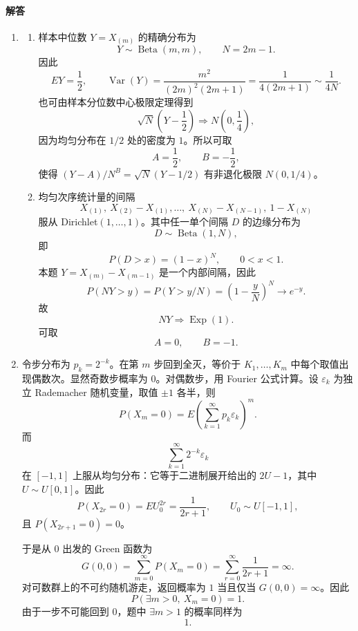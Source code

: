 \documentclass[UTF8,12pt]{ctexart}
\begin{document}
\paragraph{解答}
\begin{enumerate}[label=\textbf{\arabic*.},leftmargin=2.2em]
\item
\begin{enumerate}[label=\textbf{(\alph*)},leftmargin=2.4em]
\item 样本中位数 \(Y=X_{(m)}\) 的精确分布为
\[
Y\sim \operatorname{Beta}(m,m),\qquad N=2m-1.
\]
因此
\[
E Y=\frac12,\qquad
\operatorname{Var}(Y)=\frac{m^2}{(2m)^2(2m+1)}
=\frac1{4(2m+1)}\sim \frac1{4N}.
\]
也可由样本分位数中心极限定理得到
\[
\sqrt N\left(Y-\frac12\right)\Rightarrow N\left(0,\frac14\right),
\]
因为均匀分布在 \(1/2\) 处的密度为 \(1\)。所以可取
\[
A=\frac12,\qquad B=-\frac12,
\]
使得 \((Y-A)/N^B=\sqrt N(Y-1/2)\) 有非退化极限 \(N(0,1/4)\)。
\item 均匀次序统计量的间隔
\[
X_{(1)},\ X_{(2)}-X_{(1)},\ldots,\ X_{(N)}-X_{(N-1)},\ 1-X_{(N)}
\]
服从 Dirichlet\((1,\ldots,1)\)。其中任一单个间隔 \(D\) 的边缘分布为
\[
D\sim \operatorname{Beta}(1,N),
\]
即
\[
P(D>x)=(1-x)^N,\qquad 0<x<1.
\]
本题 \(Y=X_{(m)}-X_{(m-1)}\) 是一个内部间隔，因此
\[
P(NY>y)=P(Y>y/N)=\left(1-\frac yN\right)^N\to e^{-y}.
\]
故
\[
NY\Rightarrow \operatorname{Exp}(1).
\]
可取
\[
A=0,\qquad B=-1.
\]
\end{enumerate}

\item 令步分布为 \(p_k=2^{-k}\)。在第 \(m\) 步回到全灭，等价于 \(K_1,\ldots,K_m\) 中每个取值出现偶数次。显然奇数步概率为 \(0\)。对偶数步，用 Fourier 公式计算。设 \(\varepsilon_k\) 为独立 Rademacher 随机变量，取值 \(\pm1\) 各半，则
\[
P(X_m=0)=E\left(\sum_{k=1}^{\infty}p_k\varepsilon_k\right)^m.
\]
而
\[
\sum_{k=1}^{\infty}2^{-k}\varepsilon_k
\]
在 \([-1,1]\) 上服从均匀分布：它等于二进制展开给出的 \(2U-1\)，其中 \(U\sim U[0,1]\)。因此
\[
P(X_{2r}=0)=E U_0^{2r}=\frac1{2r+1},
\qquad U_0\sim U[-1,1],
\]
且 \(P(X_{2r+1}=0)=0\)。

于是从 \(0\) 出发的 Green 函数为
\[
G(0,0)=\sum_{m=0}^{\infty}P(X_m=0)
=\sum_{r=0}^{\infty}\frac1{2r+1}=\infty.
\]
对可数群上的不可约随机游走，返回概率为 \(1\) 当且仅当 \(G(0,0)=\infty\)。因此
\[
P(\exists m>0,\ X_m=0)=1.
\]
由于一步不可能回到 \(0\)，题中 \(\exists m>1\) 的概率同样为
\[
1.
\]


\end{enumerate}
\end{document}
